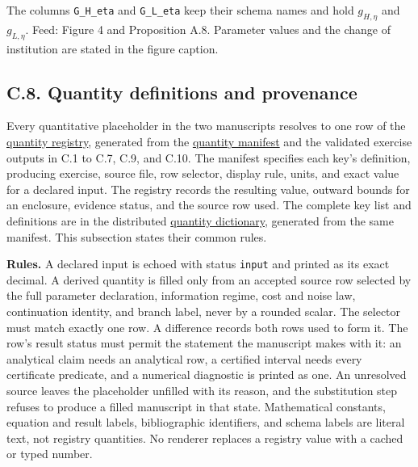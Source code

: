 \documentclass[
  11pt,
]{article}
\begin{document}
The columns \texttt{G\_H\_eta} and \texttt{G\_L\_eta} keep their schema names
and hold \(g_{H,\eta}\) and \(g_{L,\eta}\). Feed: Figure 4 and Proposition A.8.
Parameter values and the change of
institution are stated in the figure caption.

\subsection{C.8. Quantity definitions and
provenance}\label{oa-c-registry}

Every quantitative placeholder in the two manuscripts resolves to one
row of the \href{../numerics/quantity_registry.csv}{quantity registry},
generated from the \href{quantity_manifest.csv}{quantity manifest} and
the validated exercise outputs in C.1 to C.7, C.9, and C.10. The manifest specifies
each key's definition, producing exercise, source file, row selector,
display rule, units, and exact value for a declared input. The registry
records the resulting value, outward bounds for an enclosure, evidence
status, and the source row used. The complete key list and definitions
are in the distributed
\href{../replication/quantity_dictionary.md}{quantity dictionary},
generated from the same manifest. This subsection states their common
rules.

\textbf{Rules.} A declared input is echoed with status \texttt{input}
and printed as its exact decimal. A derived quantity is filled only from
an accepted source row selected by the full parameter declaration,
information regime, cost and noise law, continuation identity, and
branch label, never by a rounded scalar. The selector must match exactly
one row. A difference records both rows used to form it. The row's
result status must permit the statement the manuscript makes with it: an
analytical claim needs an analytical row, a certified interval needs
every certificate predicate, and a numerical diagnostic is printed as
one. An unresolved source leaves the placeholder unfilled with its
reason, and the substitution step refuses to produce a filled manuscript
in that state. Mathematical constants, equation and result labels,
bibliographic identifiers, and schema labels are literal text, not
registry quantities. No renderer replaces a registry value with a cached
or typed number.
\end{document}
